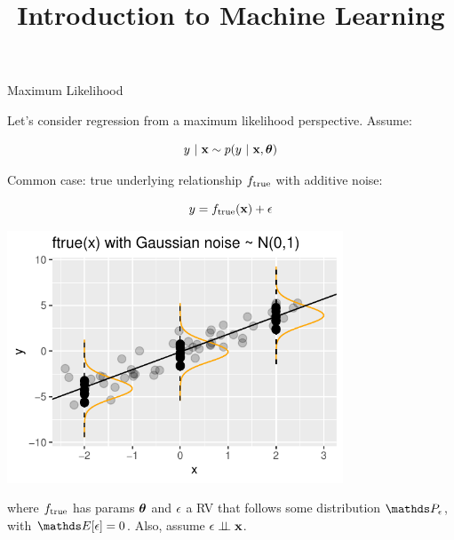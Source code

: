\documentclass[11pt,compress,t,notes=noshow, xcolor=table]{beamer}
\title{Introduction to Machine Learning}
\begin{document}
    

\begin{vbframe}{Maximum Likelihood}

Let's consider regression from a maximum likelihood perspective. Assume: 

$$
	y~|~ \mathbf{x} \sim p(y~|~\mathbf{x}, \bm{\theta})
$$

\vspace{0.5cm}

Common case: 
true underlying relationship $f_{\text{true}}$ with additive noise: 

\vspace{0.5cm}

\begin{minipage}{0.5\textwidth}
$$
y = f_{\text{true}}(\mathbf{x}) + \epsilon
$$
\end{minipage}%
\begin{minipage}{0.5\textwidth}
\includegraphics[width = 0.75\textwidth]{figure/ftrue.pdf}
\end{minipage}

where $f_{\text{true}}$ has params $\bm{\theta}$ and $\epsilon$ a RV that follows some distribution $\P_\eps$, with $\E[\eps] = 0$. Also, assume $\epsilon \perp \!\!\! \perp \mathbf{x}$.


\framebreak 


\end{vbframe}
\end{document}
